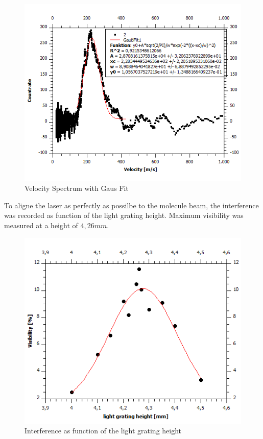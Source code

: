 \documentclass[12pt,a4paper]{article}
\begin{document}
\begin{multicols}{2}
\begin{figure}[H]
 \centering
\includegraphics[scale=0.65]{./data/Vel_Spectrum.png}
\caption{Velocity Spectrum with Gaus Fit}
\label{fig:Velocity Spectrum}
\end{figure}


To aligne the laser as perfectly as possilbe to the molecule beam, the interference was recorded as function of the light grating height. Maximum visibility was measured at a height of $4,26 mm$.


\begin{figure}[H]
\centering
\includegraphics[scale=0.65]{./data/LGH.png}
\caption{Interference as function of the light grating height}
\label{fig:LGH}
\end{figure}



\end{multicols}
\end{document}
